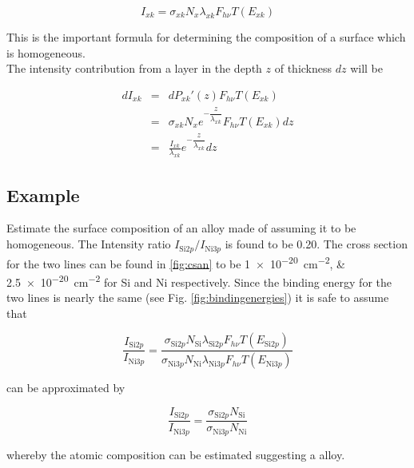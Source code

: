 \begin{equation}
I_{xk}=\sigma_{xk}N_x\lambda_{xk}F_{h\nu}T(E_{xk})
\end{equation}

This is the important formula for determining the composition of a surface which is homogeneous.\\

The intensity contribution from a layer in the depth $z$ of thickness $dz$ will be

\begin{eqnarray}
dI_{xk}	& =	& dP_{xk}\prime(z)F_{h\nu}T(E_{xk})\\
	& =	& \sigma_{xk}N_xe^{-\dfrac{z}{\lambda_{xk}}}F_{h\nu}T(E_{xk})dz\\
	& =	& \frac{I_{xk}}{\lambda_{xk}}e^{-\dfrac{z}{\lambda_{xk}}}dz \label{eq:intcontr}
\end{eqnarray}

\subsection{Example}
Estimate the surface composition of an alloy made of  assuming it to be homogeneous. The Intensity ratio $I_{\mathrm{Si}2p}/I_{\mathrm{Ni}3p}$ is found to be 0.20. The cross section for the two lines can be found in \autoref{fig:csan} to be \SIlist{1e-20;2.5e-20}{cm^{-2}} for Si and Ni respectively. Since the binding energy for the two lines is nearly the same (see Fig. \ref{fig:bindingenergies}) it is safe to assume that

\begin{equation}
\frac{I_{\mathrm{Si}2p}}{I_{\mathrm{Ni}3p}}=\frac{\sigma_{\mathrm{Si}2p}N_{\mathrm{Si}}\lambda_{\mathrm{Si}2p}F_{h\nu}T(E_{\mathrm{Si}2p})}{\sigma_{\mathrm{Ni}3p}N_{\mathrm{Ni}}\lambda_{\mathrm{Ni}3p}F_{h\nu}T(E_{\mathrm{Ni}3p})}
\end{equation}

\noindent can be approximated by

\begin{equation}
\frac{I_{\mathrm{Si}2p}}{I_{\mathrm{Ni}3p}}=\frac{\sigma_{\mathrm{Si}2p}N_{\mathrm{
Si}}}{\sigma_{\mathrm{Ni}3p}N_{\mathrm{Ni}}}
\end{equation}

whereby the atomic composition can be estimated suggesting a  alloy.


